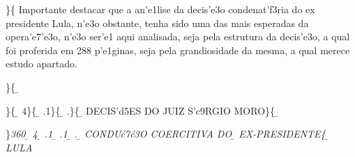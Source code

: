  \ltrch{}  \par \}\{\rtlch{}  \ltrch{}
 \tab Importante destacar que a an'e1lise da decis'e3o
condenat'f3ria do ex presidente Lula, n'e3o obstante, tenha sido uma das
mais esperadas da opera'e7'e3o, n'e3o ser'e1 aqui analisada, seja pela
estrutura da decis'e3o, a qual foi proferida em 288 p'e1ginas, seja pela
grandiosidade da mesma, a qual merece estudo apartado.
\par \}\{\rtlch{} \ab{} \ltrch{} \b{}
\par \}\{\rtlch{} \ab{} \ltrch{}
\b{} 4\}\{\rtlch{} \ab{}
\ltrch{} \b{} .1\}\{\rtlch{}
\ab{} \ltrch{} \b{} .\}\{\rtlch{}
\ab{} \ltrch{} \b{}
DECIS'd5ES DO JUIZ S'c9RGIO MORO\}\{\rtlch{} \ab{}
\ltrch{} \b{}
\par \}\pard \ltrpar\qj {}\sl360\widctlpar\wrapdefault\faauto{} {\rtlch{} \ab{} \ltrch{} \b{} 4}{\rtlch{} \ab{} \ltrch{} 
\b{} .1}{\rtlch{} \ab{} \ltrch{} \b{} .1}{\rtlch{} \ab{} \ltrch{} \b{} .}{\rtlch{} \ab{} \ltrch{} 
\b{}  CONDU\'c7\'c3O COERCITIVA DO }{\rtlch{} \ab{} \ltrch{} \b{} EX-PRESIDENTE}\{\rtlch{}
\ab{} \ltrch{} \b{} LULA

\par 

